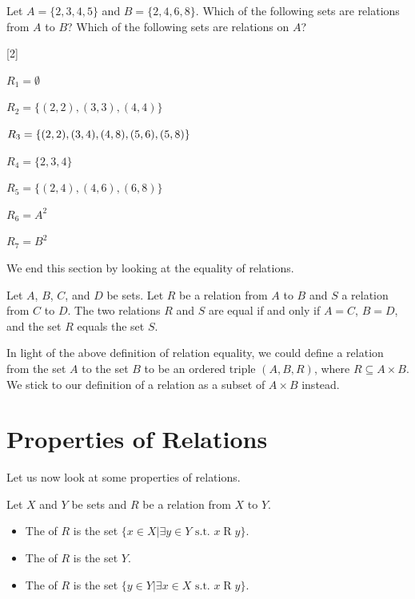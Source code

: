 \begin{exercise}
    Let $A = \{2, 3, 4, 5\}$ and $B = \{2, 4, 6, 8\}$. Which of the following sets are relations from $A$ to $B$? Which of the following sets are relations on $A$?
    \begin{partquestions}{\alph*}[2]
        \item $R_1 = \emptyset$
        \item $R_2 = \{(2, 2), (3, 3), (4, 4)\}$
        \item $R_3 = \{(2, 2), (3, 4), (4, 8), \linebreak(5, 6), (5, 8)\}$
        \item $R_4 = \{2, 3, 4\}$
        \item $R_5 = \{(2, 4), (4, 6), (6, 8)\}$
        \item $R_6 = A^2$
        \item $R_7 = B^2$
    \end{partquestions}
\end{exercise}

We end this section by looking at the equality of relations.

\begin{definition}\label{definition:equality-of-relations}
    Let $A$, $B$, $C$, and $D$ be sets. Let $R$ be a relation from $A$ to $B$ and $S$ a relation from $C$ to $D$. The two relations $R$ and $S$ are equal if and only if $A = C$, $B = D$, and the set $R$ equals the set $S$.
\end{definition}
\begin{remark}
    In light of the above definition of relation equality, we could define a relation from the set $A$ to the set $B$ to be an ordered triple $(A, B, R)$, where $R \subseteq A \times B$. We stick to our definition of a relation as a subset of $A \times B$ instead.
\end{remark}

\section{Properties of Relations}
Let us now look at some properties of relations.

\begin{definition}
    Let $X$ and $Y$ be sets and $R$ be a relation from $X$ to $Y$.
    \begin{itemize}
        \item The  of $R$ is the set $\{x \in X \vert \exists y \in Y \text{ s.t. } x \mathrel{R} y\}$.
        \item The  of $R$ is the set $Y$.
        \item The  of $R$ is the set $\{y \in Y \vert \exists x \in X \text{ s.t. } x \mathrel{R} y\}$.
    \end{itemize}
\end{definition}

